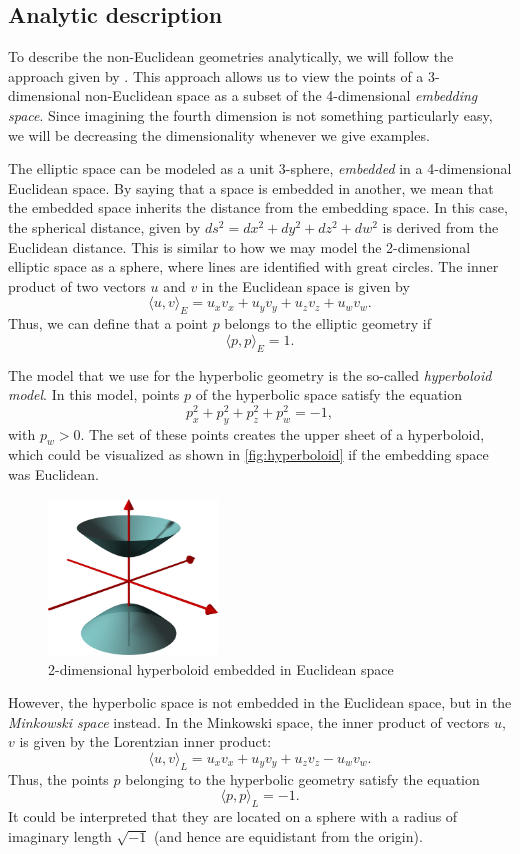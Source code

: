\subsection{Analytic description}
To describe the non-Euclidean geometries analytically, we will follow the approach given by \cite{Szirmay-Kalos2022}.
This approach allows us to view the points of a 3-dimensional non-Euclidean space as a subset of the 4-dimensional \textit{embedding space}.
Since imagining the fourth dimension is not something particularly easy, we will be decreasing the dimensionality whenever we give examples.

The elliptic space can be modeled as a unit 3-sphere, \textit{embedded} in a 4-dimensional Euclidean space.
By saying that a space is embedded in another, we mean that the embedded space inherits the distance from the embedding space.
In this case, the spherical distance, given by $ds^2 = dx^2 + dy^2 + dz^2 + dw^2$ is derived from the Euclidean distance.
This is similar to how we may model the 2-dimensional elliptic space as a sphere, where lines are identified with great circles.
The inner product of two vectors $u$ and $v$ in the Euclidean space is given by
$$ \langle u, v \rangle_E  = u_xv_x + u_yv_y + u_zv_z + u_wv_w.$$
Thus, we can define that a point $p$ belongs to the elliptic geometry if
$$ \langle p, p \rangle_E = 1.$$

The model that we use for the hyperbolic geometry is the so-called \textit{hyperboloid model}.
In this model, points $p$ of the hyperbolic space satisfy the equation
$$p_x^2 + p_y^2 + p_z^2 + p_w^2 = -1,$$
with $p_w > 0$.
The set of these points creates the upper sheet of a hyperboloid, which could be visualized as shown in \autoref{fig:hyperboloid} if the embedding space was Euclidean.
\begin{figure}[h]
    \centering
    \includegraphics[width=0.4\textwidth]{chapters/theoretical_foundations/sections/non-eudlidean-spaces/resources/hyperboloid.png}
    \caption{2-dimensional hyperboloid embedded in Euclidean space}
    \label{fig:hyperboloid}
\end{figure}
However, the hyperbolic space is not embedded in the Euclidean space, but in the \textit{Minkowski space} instead.
In the Minkowski space, the inner product of vectors $u$, $v$ is given by the Lorentzian inner product:
$$\langle u, v \rangle_L = u_xv_x + u_yv_y + u_zv_z - u_wv_w.$$
Thus, the points $p$ belonging to the hyperbolic geometry satisfy the equation
$$\langle p, p \rangle_L = -1.$$
It could be interpreted that they are located on a sphere with a radius of imaginary length $\sqrt{-1}$ (and hence are equidistant from the origin).

